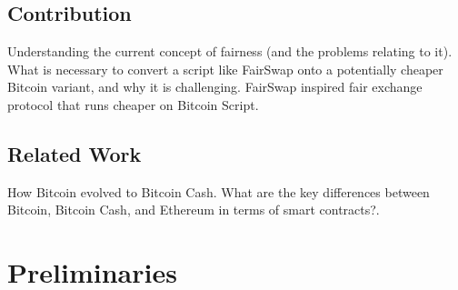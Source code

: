 \documentclass{cacthesis}
\newcounter{protocol}
\begin{document}
        
        
        \section{Contribution}
        Understanding the current concept of fairness (and the problems relating to it). \\
        What is necessary to convert a script like FairSwap onto a potentially cheaper Bitcoin variant, and why it is challenging.
        FairSwap inspired fair exchange protocol that runs cheaper on Bitcoin Script.

        \section{Related Work}
        How Bitcoin evolved to Bitcoin Cash. What are the key differences between Bitcoin, Bitcoin Cash, and Ethereum in terms of smart contracts?.
    
    \chapter{Preliminaries}
\end{document}
